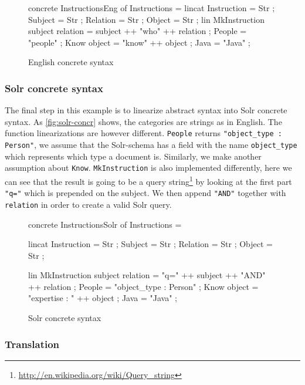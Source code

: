 \newenvironment{myfont}{\myfont}{\par}

\begin{figure}[h]
\begin{code}
concrete InstructionsEng of Instructions = {
  lincat
    Instruction = Str ;
    Subject = Str ;
    Relation = Str ;
    Object = Str ;
  lin
    MkInstruction subject relation = subject ++ "who" ++ relation ;
    People = "people" ;
    Know object = "know" ++ object ;
    Java = "Java" ;
}
\end{code}
\caption{English concrete syntax\label{fig:english-concr}}
\end{figure}

\subsubsection*{Solr concrete syntax}

The final step in this example is to linearize abstract syntax into Solr concrete syntax.
  As \autoref{fig:solr-concr} shows, the categories are strings as in English. The function linearizations are however
  different. \texttt{People} returns 
  \texttt{"object\_type : Person"}, we assume that 
  the Solr-schema has a field with the name \texttt{object\_type} which represents 
  which type a document is. Similarly, we make another assumption about \texttt{Know}. \texttt{MkInstruction} is also implemented differently, here we can see that the result is going to be a query string\footnote{\url{http://en.wikipedia.org/wiki/Query\_string}} by looking at the first part \texttt{"q="} which is prepended on the subject. We then append \texttt{"AND"} together with \texttt{relation} in order to create a valid Solr query.

\begin{figure}[h]
\begin{code}
concrete InstructionsSolr of Instructions = {
    lincat
      Instruction = Str ;
      Subject = Str ;
      Relation = Str ;
      Object = Str ;

    lin
      MkInstruction subject relation = "q=" ++ subject ++ "AND" ++ relation ;
      People = "object_type : Person" ;
      Know object = "expertise : " ++ object ;
      Java = "Java" ;
}
\end{code}
\caption{Solr concrete syntax\label{fig:solr-concr}}
\end{figure}

\pagebreak

\subsubsection*{Translation}

